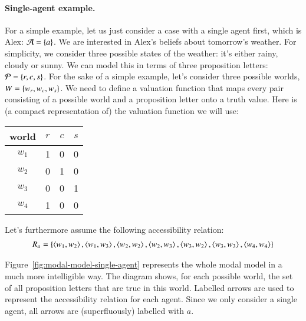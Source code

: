 \documentclass[nobib,nofonts]{tufte-handout}
\begin{document}
\paragraph{Single-agent example.}
For a simple example, let us just consider a case with a single agent first, which is Alex: $\mathcal{A} = \left\{a\right\}$.
We are interested in Alex's beliefs about tomorrow's weather.
For simplicity, we consider three possible states of the weather: it's either rainy, cloudy or sunny.
We can model this in terms of three proposition letters: $\mathcal{P} = \left\{r, c, s\right\}$.
For the sake of a simple example, let's consider three possible worlds, $W = \left\{w_{r}, w_{c}, w_{s}\right\}$.
We need to define a valuation function that maps every pair consisting of a possible world and a proposition letter onto a truth value.
Here is (a compact representation of) the valuation function we will use:
\begin{center}
  \begin{tabular}{cccc}
    world & $r$ & $c$ & $s$ \\ \hline
    $w_{1}$ & 1 & 0 & 0 \\
    $w_{2}$ & 0 & 1 & 0 \\
    $w_{3}$ & 0 & 0 & 1 \\
    $w_{4}$ & 1 & 0 & 0 \\
  \end{tabular}
\end{center}
Let's furthermore assume the following accessibility relation:
\begin{align*}
  R_{a} = \left\{
  \left \langle w_{1}, w_{2}\right\rangle, \left \langle w_{1}, w_{3}\right\rangle,
  \left \langle w_{2}, w_{2}\right\rangle, \left \langle w_{2}, w_{3}\right\rangle,
  \left \langle w_{3}, w_{2}\right\rangle, \left \langle w_{3}, w_{3}\right\rangle,
  \left \langle w_{4}, w_{4}\right\rangle
  \right\}
\end{align*}

Figure~\ref{fig:modal-model-single-agent} represents the whole modal model in a much more intelligible way.
The diagram shows, for each possible world, the set of all proposition letters that are true in this world.
Labelled arrows are used to represent the accessibility relation for each agent.
Since we only consider a single agent, all arrows are (superfluously) labelled with $a$.
\end{document}
